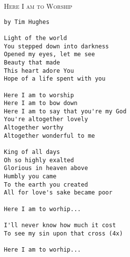 \documentclass[10pt,oneside,footinclude=true,headinclude=true]{scrbook} %
\makeatletter
\newcommand{\verbatimfont}[1]{\renewcommand{\verbatim@font}{#1}}
\newcommand\songtitle[1]{
	\hspace*{-3.7mm}\Large\textsc{#1}
}
\makeatother
\begin{document}
\pagestyle{empty}
\verbatimfont{\rmfamily\large}

%
%
%
%
%
%    



\newpage
\bigskip
\songtitle{Here I am to Worship}
\begin{verbatim}
by Tim Hughes

Light of the world
You stepped down into darkness
Opened my eyes, let me see
Beauty that made
This heart adore You
Hope of a life spent with you

Here I am to worship
Here I am to bow down
Here I am to say that you're my God
You're altogether lovely
Altogether worthy
Altogether wonderful to me

King of all days
Oh so highly exalted
Glorious in heaven above
Humbly you came
To the earth you created
All for love's sake became poor

Here I am to worhip...

I'll never know how much it cost
To see my sin upon that cross (4x)

Here I am to worhip...

\end{verbatim}
\end{document}
